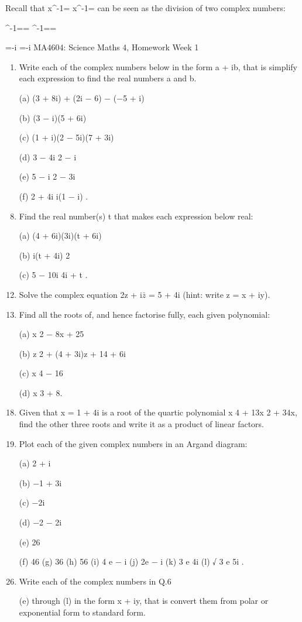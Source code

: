 Recall that {\displaystyle x^{-1}={}} {\displaystyle x^{-1}={}} can be seen as the division of two complex numbers:

{^{-1}={}=} {^{-1}={}=}

{={}-{}i} {={}-{}i}
MA4604: Science Maths 4, Homework Week 1
\begin{enumerate}
\item Write each of the complex numbers below in the form a + ib, that is simplify each
expression to find the real numbers a and b.
\item[(a)] (3 + 8i) + (2i − 6) − (−5 + i) \item[(b)] (3 − i)(5 + 6i) \item[(c)] (1 + i)(2 − 5i)(7 + 3i)
\item[(d)] 3 − 4i
2 − i
\item[(e)] 5 − i
2 − 3i
\item[(f)] 2 + 4i
i(1 − i)
.
\item Find the real number(s) t that makes each expression below real:
\item[(a)] (4 + 6i)(3i)(t + 6i) \item[(b)] i(t + 4i)
2
\item[(c)] 5 − 10i
4i + t
.
\item Solve the complex equation 2z + i$\bar{z}$ = 5 + 4i (hint: write z = x + iy).
\item Find all the roots of, and hence factorise fully, each given polynomial:
\item[(a)] x
2 − 8x + 25 \item[(b)] z
2 + (4 + 3i)z + 14 + 6i \item[(c)] x
4 − 16 \item[(d)] x
3 + 8.
\item Given that x = 1 + 4i is a root of the quartic polynomial x
4 + 13x
2 + 34x, find the other
three roots and write it as a product of linear factors.
\item Plot each of the given complex numbers in an Argand diagram:
\item[(a)] 2 + i \item[(b)] −1 + 3i \item[(c)] −2i \item[(d)] −2 − 2i
\item[(e)] 26
\item[(f)] 46
(g) 36
(h) 56 \pi
(i) 4 e
− i (j) 2e
− i (k) 3 e
4i (l) √
3 e
5i .
\item Write each of the complex numbers in Q.6 \item[(e)] through (l) in the form x + iy, that is
convert them from polar or exponential form to standard form.
\end{enumerate}

